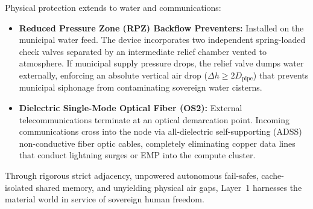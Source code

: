 Physical protection extends to water and communications:
\begin{itemize}
    \item \textbf{Reduced Pressure Zone (RPZ) Backflow Preventers:} Installed on the municipal water feed. The device incorporates two independent spring-loaded check valves separated by an intermediate relief chamber vented to atmosphere. If municipal supply pressure drops, the relief valve dumps water externally, enforcing an absolute vertical air drop ($\Delta h \ge 2 D_{\mathrm{pipe}}$) that prevents municipal siphonage from contaminating sovereign water cisterns.
    \item \textbf{Dielectric Single-Mode Optical Fiber (OS2):} External telecommunications terminate at an optical demarcation point. Incoming communications cross into the node via all-dielectric self-supporting (ADSS) non-conductive fiber optic cables, completely eliminating copper data lines that conduct lightning surges or EMP into the compute cluster.
\end{itemize}

Through rigorous strict adjacency, unpowered autonomous fail-safes, cache-isolated shared memory, and unyielding physical air gaps, Layer~1 harnesses the material world in service of sovereign human freedom.
